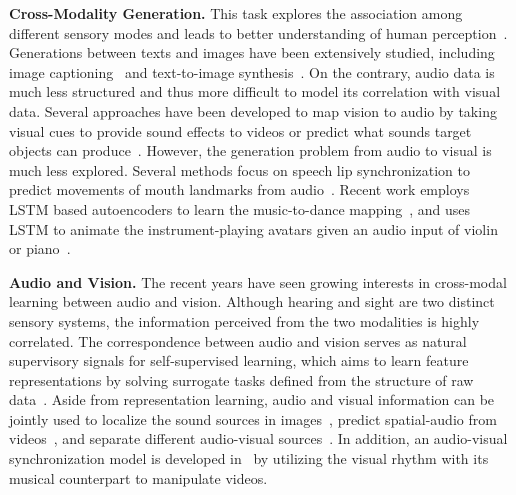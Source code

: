 \documentclass{article}
\begin{document}
\textbf{Cross-Modality Generation.}
This task explores the association among different sensory modes and leads to better understanding of human perception~\cite{karpathy2015deep,karras2017audio,DRIT,owens2016visually,reed2016generative,vinyals2015show,zhang2017stackgan}.
Generations between texts and images have been extensively studied, including image captioning~\cite{karpathy2015deep,vinyals2015show} and text-to-image synthesis~\cite{reed2016generative, zhang2017stackgan}.
On the contrary, audio data is much less structured and thus more difficult to model its correlation with visual data.
Several approaches have been developed to map vision to audio by taking visual cues to provide sound effects to videos or predict what sounds target objects can produce~\cite{Davis2014VisualMic, owens2016visually, zhou2017visual}. 
However, the generation problem from audio to visual is much less explored.
Several methods focus on speech lip synchronization to predict movements of mouth landmarks from audio~\cite{karras2017audio,suwajanakorn2017synthesizing}.
Recent work employs LSTM based autoencoders to learn the music-to-dance mapping~\cite{tang2018dance}, and uses LSTM to animate the instrument-playing avatars given an audio input of violin or piano~\cite{shlizerman2017audio}.

\textbf{Audio and Vision.} The recent years have seen growing interests in cross-modal learning between audio and vision.
Although hearing and sight are two distinct sensory systems, the information perceived from the two modalities is highly correlated.
The correspondence between audio and vision serves as natural supervisory signals for self-supervised learning, which aims to learn feature representations by solving surrogate tasks defined from the structure of raw data~\cite{arandjelovic2017look, aytar2016soundnet,doersch2015unsupervised,lee2017unsupervised,owens2016ambient}. 
Aside from representation learning, audio and visual information can be jointly used to localize the sound sources in images~\cite{arandjelovic2017objects, harwath2018jointly, senocak2018learning}, predict spatial-audio from videos~\cite{lu2019self}, and separate different audio-visual sources~\cite{ephrat2018looking,gao2018learning,owens2018audio}.
In addition, an audio-visual synchronization model is developed in~\cite{davis2018visual} by utilizing the visual rhythm with its musical counterpart to manipulate videos. 
\end{document}

